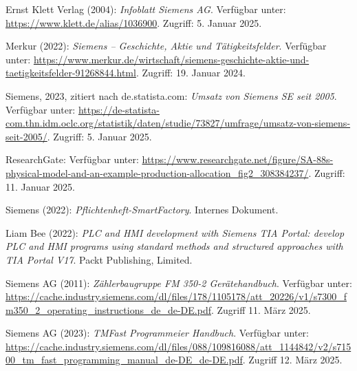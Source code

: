 
\begin{thebibliography}{}

Ernst Klett Verlag (2004): \textit{Infoblatt Siemens AG}. Verfügbar unter: \url{https://www.klett.de/alias/1036900}. Zugriff: 5. Januar 2025.

Merkur (2022): \textit{Siemens – Geschichte, Aktie und Tätigkeitsfelder}. Verfügbar unter: \url{https://www.merkur.de/wirtschaft/siemens-geschichte-aktie-und-taetigkeitsfelder-91268844.html}. Zugriff: 19. Januar 2024.

Siemens, 2023, zitiert nach de.statista.com: \textit{Umsatz von Siemens SE seit 2005}. Verfügbar unter: \url{https://de-statista-com.thn.idm.oclc.org/statistik/daten/studie/73827/umfrage/umsatz-von-siemens-seit-2005/}. Zugriff: 5. Januar 2025.

ResearchGate: Verfügbar unter: \url{https://www.researchgate.net/figure/SA-88s-physical-model-and-an-example-production-allocation_fig2_308384237/}. Zugriff: 11. Januar 2025.

Siemens (2022): \textit{Pflichtenheft-SmartFactory}. Internes Dokument.

Liam Bee (2022): \textit{PLC and HMI development with Siemens TIA Portal: develop PLC and HMI programs using standard methods and structured approaches with TIA Portal V17}. Packt Publishing, Limited. 




Siemens AG (2011): \textit{Zählerbaugruppe FM 350-2 Gerätehandbuch}. Verfügbar unter: \url{https://cache.industry.siemens.com/dl/files/178/1105178/att_20226/v1/s7300_fm350_2_operating_instructions_de_de-DE.pdf}. Zugriff 11. März 2025.

Siemens AG (2023): \textit{TMFast Programmeier Handbuch}. Verfügbar unter: \url{https://cache.industry.siemens.com/dl/files/088/109816088/att_1144842/v2/s71500_tm_fast_programming_manual_de-DE_de-DE.pdf}. Zugriff 12. März 2025.


\end{thebibliography}